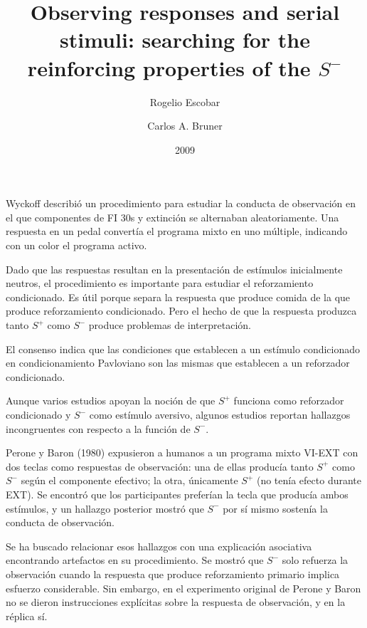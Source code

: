 \documentclass[a4paper,12pt]{article}
\title{Observing responses and serial stimuli: searching for the reinforcing properties of the $S^{-}$}
\author{Rogelio Escobar \and Carlos A. Bruner}
\date{2009}
\begin{document}
{\scshape\bfseries \maketitle}

Wyckoff describió un procedimiento para estudiar la conducta de observación en el que componentes de FI 30s y extinción se alternaban aleatoriamente.
Una respuesta en un pedal convertía el programa mixto en uno múltiple, indicando con un color el programa activo.

Dado que las respuestas resultan en la presentación de estímulos inicialmente neutros, el procedimiento es importante para estudiar el reforzamiento condicionado.
Es útil porque separa la respuesta que produce comida de la que produce reforzamiento condicionado.
Pero el hecho de que la respuesta produzca tanto $S^{+}$ como $S^{-}$ produce problemas de interpretación.

El consenso indica que las condiciones que establecen a un estímulo condicionado en condicionamiento Pavloviano son las mismas que establecen a un reforzador condicionado.

Aunque varios estudios apoyan la noción de que $S^{+}$ funciona como reforzador condicionado y $S^{-}$ como estímulo aversivo, algunos estudios reportan hallazgos incongruentes con respecto a la función de $S^{-}$.

Perone y Baron (1980) expusieron a humanos a un programa mixto VI-EXT con dos teclas como respuestas de observación: una de ellas producía tanto $S^{+}$ como $S^{-}$ según el componente efectivo; la otra, únicamente $S^{+}$ (no tenía efecto durante EXT).
Se encontró que los participantes preferían la tecla que producía ambos estímulos, y un hallazgo posterior mostró que $S^{-}$ por sí mismo sostenía la conducta de observación.

Se ha buscado relacionar esos hallazgos con una explicación asociativa encontrando artefactos en su procedimiento.
Se mostró que $S^{-}$ solo refuerza la observación cuando la respuesta que produce reforzamiento primario implica esfuerzo considerable.
Sin embargo, en el experimento original de Perone y Baron no se dieron instrucciones explícitas sobre la respuesta de observación, y en la réplica sí.
\end{document}

